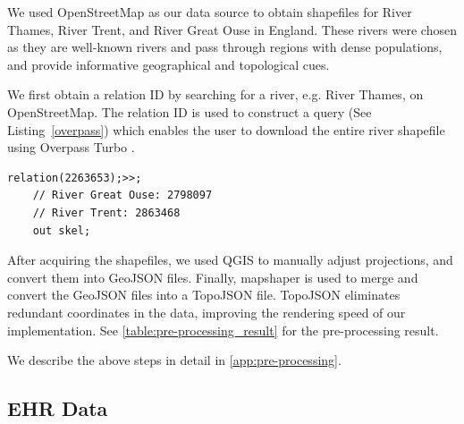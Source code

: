  We used OpenStreetMap \cite{openstreetmapRelation} as our data source to obtain shapefiles for River Thames, River Trent, and River Great Ouse in England. These rivers were chosen as they are well-known rivers and pass through regions with dense populations, and provide informative geographical and topological cues.

We first obtain a relation ID by searching for a river, e.g. River Thames, on OpenStreetMap. The relation ID is used to construct a query (See Listing~\ref{overpass}) which enables the user to download the entire river shapefile using Overpass Turbo \cite{overpassturboOverpass}.

\begin{lstlisting}[caption={The query that downloads the shapefile of River Thames from OpenStreetMap via the Overpass Turbo API.}, label={overpass},captionpos=b]
    relation(2263653);>>;
    // River Great Ouse: 2798097
    // River Trent: 2863468
    out skel;
\end{lstlisting}

After acquiring the shapefiles, we used QGIS \cite{qgisWelcome} to manually adjust projections, and convert them into GeoJSON files. Finally, mapshaper \cite{blochMapshaper} is used to merge and convert the GeoJSON files into a TopoJSON \cite{TopoJSON} file. TopoJSON eliminates redundant coordinates in the data, improving the rendering speed of our implementation. See \autoref{table:pre-processing_result} for the pre-processing result.

We describe the above steps in detail in \autoref{app:pre-processing}.

\subsection{EHR Data}

